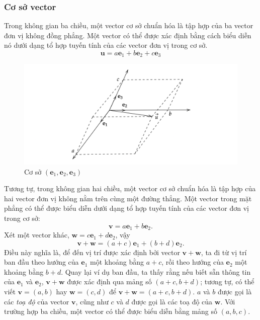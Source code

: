 \subsubsection{Cơ sở vector}
Trong không gian ba chiều, một vector cơ sở chuẩn hóa là tập hợp của ba vector đơn vị không đồng phẳng. Một vector có thể được xác định bằng cách biểu diễn nó dưới dạng tổ hợp tuyến tính của các vector đơn vị trong cơ sở.
\begin{equation}
    \mathbf{u}=a\mathbf{e}_1+b\mathbf{e}_2+c\mathbf{e}_3
\end{equation}
\begin{figure}[H]
    \centering
    \includegraphics[width=1\textwidth]{Tuan2/Figures/cosovector.png}
    \caption{Cơ sở \((\mathbf{e}_1, \mathbf{e}_2, \mathbf{e}_3)\)}
\end{figure}
Tương tự, trong không gian hai chiều, một vector cơ sở chuẩn hóa là tập hợp của hai vector đơn vị không nằm trên cùng một đường thẳng. Một vector trong mặt phẳng có thể được biểu diễn dưới dạng tổ hợp tuyến tính của các vector đơn vị trong cơ sở:
\[\mathbf{v}=a\mathbf{e}_1 +b\mathbf{e}_2.\]
Xét một vector khác, \(\mathbf{w}=c\mathbf{e}_1 +d\mathbf{e}_2\), vậy \[\mathbf{v}+\mathbf{w}=(a+c)\mathbf{e}_1 +(b+d)\mathbf{e}_2 .\]
Điều này nghĩa là, để đến vị trí được xác định bởi vector \(\mathbf{v}+\mathbf{w}\), ta đi từ vị trí ban đầu theo hướng của \(\mathbf{e}_1\) một khoảng bằng \(a+c\), rồi theo hướng của \(\mathbf{e}_2\) một khoảng bằng \(b+d\). Quay lại ví dụ ban đầu, ta thấy rằng nếu biết sẵn thông tin của \(\mathbf{e}_1\) và \(\mathbf{e}_2\), \(\mathbf{v}+\mathbf{w}\) được xác định qua mảng số \((a+c,b+d)\); 
tương tự, có thể viết \(\mathbf{v}=(a,b)\) hay \(\mathbf{w}=(c,d)\) để \(\mathbf{v}+\mathbf{w}=(a+c,b+d)\). \(a\) và \(b\) được gọi là các \emph{toạ độ} của vector \(\mathbf{v}\), cũng như \(c\) và \(d\) được gọi là các toạ độ của \(\mathbf{w}\).
Với trường hợp ba chiều, một vector có thể được biểu diễn bằng mảng số \((a,b,c)\).
\vspace{8pt}

